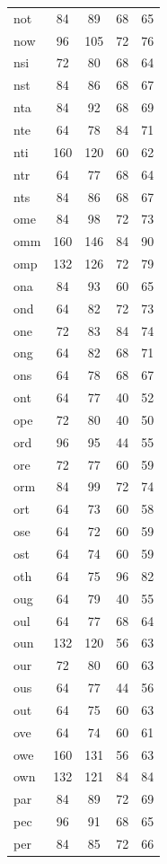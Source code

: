 \documentclass[ms,electronic,twosidetoc,letterpaper,chaptercenter,parttop,lof,lot]{byumsphd}
\begin{document}
\begin{longtable}{| l | c c | c c |}
  not & 84 & 89 & 68 & 65 \\
  now & 96 & 105 & 72 & 76 \\
  nsi & 72 & 80 & 68 & 64 \\
  nst & 84 & 86 & 68 & 67 \\
  nta & 84 & 92 & 68 & 69 \\
  nte & 64 & 78 & 84 & 71 \\
  nti & 160 & 120 & 60 & 62 \\
  ntr & 64 & 77 & 68 & 64 \\
  nts & 84 & 86 & 68 & 67 \\
  ome & 84 & 98 & 72 & 73 \\
  omm & 160 & 146 & 84 & 90 \\
  omp & 132 & 126 & 72 & 79 \\
  ona & 84 & 93 & 60 & 65 \\
  ond & 64 & 82 & 72 & 73 \\
  one & 72 & 83 & 84 & 74 \\
  ong & 64 & 82 & 68 & 71 \\
  ons & 64 & 78 & 68 & 67 \\
  ont & 64 & 77 & 40 & 52 \\
  ope & 72 & 80 & 40 & 50 \\
  ord & 96 & 95 & 44 & 55 \\
  ore & 72 & 77 & 60 & 59 \\
  orm & 84 & 99 & 72 & 74 \\
  ort & 64 & 73 & 60 & 58 \\
  ose & 64 & 72 & 60 & 59 \\
  ost & 64 & 74 & 60 & 59 \\
  oth & 64 & 75 & 96 & 82 \\
  oug & 64 & 79 & 40 & 55 \\
  oul & 64 & 77 & 68 & 64 \\
  oun & 132 & 120 & 56 & 63 \\
  our & 72 & 80 & 60 & 63 \\
  ous & 64 & 77 & 44 & 56 \\
  out & 64 & 75 & 60 & 63 \\
  ove & 64 & 74 & 60 & 61 \\
  owe & 160 & 131 & 56 & 63 \\
  own & 132 & 121 & 84 & 84 \\
  par & 84 & 89 & 72 & 69 \\
  pec & 96 & 91 & 68 & 65 \\
  per & 84 & 85 & 72 & 66 \\

\end{longtable}
\end{document}
